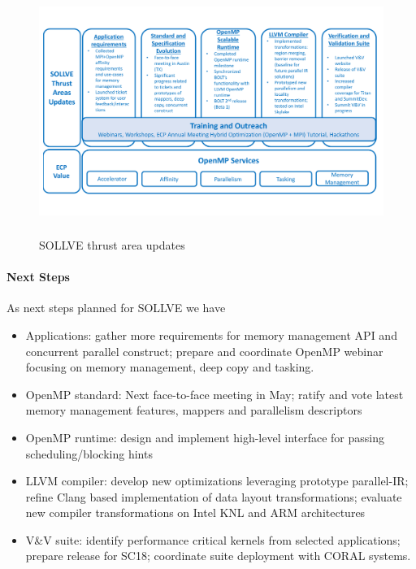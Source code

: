 \begin{figure}[t]
\includegraphics[width=0.98\linewidth,height=8cm]{projects/2.3.1-PMR/2.3.1.13-SOLLVE/SOLLVE-progress}
\caption{\label{fig:sollve-update}SOLLVE thrust area updates}
\end{figure}

\paragraph{Next Steps}
As next steps planned for SOLLVE we have
\begin{itemize}
\item Applications: gather more requirements for memory management API and concurrent parallel construct; prepare and coordinate OpenMP webinar focusing on memory management, deep copy and tasking.
\item OpenMP standard: Next face-to-face meeting in May; ratify and vote latest memory management features, mappers and parallelism descriptors
\item OpenMP runtime: design and implement high-level interface for passing scheduling/blocking hints
\item LLVM compiler: develop new optimizations leveraging prototype parallel-IR; refine Clang based implementation of data layout transformations; evaluate new compiler transformations on Intel KNL and ARM architectures
\item V\&V suite: identify performance critical kernels from selected applications; prepare release for SC18; coordinate suite deployment with CORAL systems.
\end{itemize}

